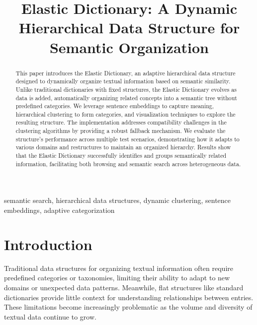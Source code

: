 \documentclass[conference]{IEEEtran}
\begin{document}
\title{Elastic Dictionary: A Dynamic Hierarchical Data Structure for Semantic Organization}

\author{
}

\maketitle

\begin{abstract}
This paper introduces the Elastic Dictionary, an adaptive hierarchical data structure designed to dynamically organize textual information based on semantic similarity. Unlike traditional dictionaries with fixed structures, the Elastic Dictionary evolves as data is added, automatically organizing related concepts into a semantic tree without predefined categories. We leverage sentence embeddings to capture meaning, hierarchical clustering to form categories, and visualization techniques to explore the resulting structure. The implementation addresses compatibility challenges in the clustering algorithms by providing a robust fallback mechanism. We evaluate the structure's performance across multiple test scenarios, demonstrating how it adapts to various domains and restructures to maintain an organized hierarchy. Results show that the Elastic Dictionary successfully identifies and groups semantically related information, facilitating both browsing and semantic search across heterogeneous data.
\end{abstract}

\begin{IEEEkeywords}
semantic search, hierarchical data structures, dynamic clustering, sentence embeddings, adaptive categorization
\end{IEEEkeywords}

\section{Introduction}

Traditional data structures for organizing textual information often require predefined categories or taxonomies, limiting their ability to adapt to new domains or unexpected data patterns. Meanwhile, flat structures like standard dictionaries provide little context for understanding relationships between entries. These limitations become increasingly problematic as the volume and diversity of textual data continue to grow.
\end{document}
